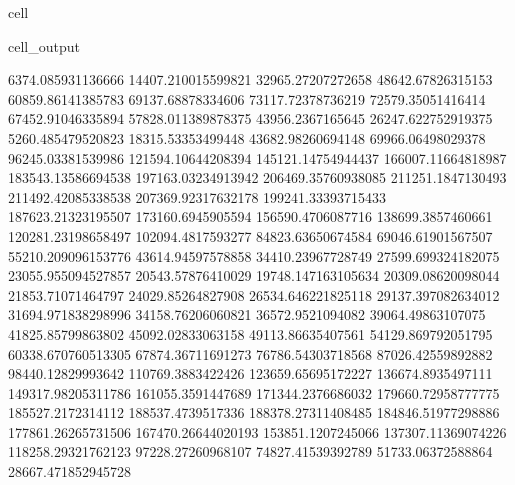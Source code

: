 \documentclass[letterpaper,10pt,english]{jupyterBook}
\begin{document}
\begin{sphinxuseclass}{cell}
\begin{sphinxVerbatimOutput}
\begin{sphinxuseclass}{cell_output}
\begin{sphinxVerbatim}[commandchars=\\\{\}]
6374.085931136666  \PYGZhy{}14407.210015599821  \PYGZhy{}32965.27207272658  \PYGZhy{}48642.67826315153  \PYGZhy{}60859.86141385783  \PYGZhy{}69137.68878334606  \PYGZhy{}73117.72378736219  \PYGZhy{}72579.35051416414  \PYGZhy{}67452.91046335894  \PYGZhy{}57828.011389878375  \PYGZhy{}43956.2367165645  \PYGZhy{}26247.622752919375  \PYGZhy{}5260.485479520823  18315.53353499448  43682.98260694148  69966.06498029378  96245.03381539986  121594.10644208394  145121.14754944437  166007.11664818987  183543.13586694538  197163.03234913942  206469.35760938085  211251.1847130493  211492.42085338538  207369.92317632178  199241.33393715433  187623.21323195507  173160.6945905594  156590.4706087716  138699.3857460661  120281.23198658497  102094.4817593277  84823.63650674584  69046.61901567507  55210.209096153776  43614.94597578858  34410.23967728749  27599.699324182075  23055.955094527857  20543.57876410029  19748.147163105634  20309.08620098044  21853.71071464797  24029.85264827908  26534.646221825118  29137.397082634012  31694.971838298996  34158.76206060821  36572.9521094082  39064.49863107075  41825.85799863802  45092.02833063158  49113.86635407561  54129.869792051795  60338.670760513305  67874.36711691273  76786.54303718568  87026.42559892882  98440.12829993642  110769.3883422426  123659.65695172227  136674.8935497111  149317.98205311786  161055.3591447689  171344.2376686032  179660.72958777775  185527.2172314112  188537.4739517336  188378.27311408485  184846.51977298886  177861.26265731506  167470.26644020193  153851.1207245066  137307.11369074226  118258.29321762123  97228.27260968107  74827.41539392789  51733.06372588864  28667.471852945728  

\end{sphinxVerbatim}
\end{sphinxuseclass}
\end{sphinxVerbatimOutput}
\end{sphinxuseclass}
\end{document}
